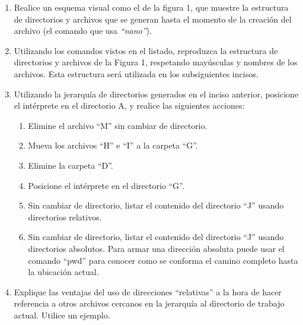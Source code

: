 \documentclass[12pt]{article}
\begin{document}
\begin{enumerate}

    \item Realice un esquema visual como el de la figura 1, que muestre la
        estructura de directorios y archivos que se generan hasta el momento
        de la creación del archivo (el comando que usa \emph{``nano''}).

    \item Utilizando los comandos vistos en el listado, reproduzca la
        estructura de directorios y archivos de la Figura 1, respetando
        mayúsculas y nombres de los archivos. Esta estructura será utilizada
        en los subsiguientes incisos.
        
    \item Utilizando la jerarquía de directorios generados en el inciso
        anterior, posicione el intérprete en el directorio A, y realice las
        siguientes acciones:

    \begin{enumerate}

        \item Elimine el archivo ``M'' sin cambiar de directorio.

        \item Mueva los archivos ``H'' e ``I'' a la carpeta ``G''.

        \item Elimine la carpeta ``D''.

        \item Posicione el intérprete en el directorio ``G''.

        \item Sin cambiar de directorio, listar el contenido del directorio
            ``J'' usando directorios relativos.

        \item Sin cambiar de directorio, listar el contenido del directorio
            ``J'' usando directorios absolutos. Para armar una dirección
            absoluta puede usar el comando ``pwd'' para conocer como se
            conforma el camino completo hasta la ubicación actual.

    \end{enumerate}

    \item Explique las ventajas del uso de direcciones ``relativas'' a la
            hora de hacer referencia a otros archivos cercanos en la jerarquía
            al directorio de trabajo actual. Utilice un ejemplo.


\end{enumerate}
\end{document}
